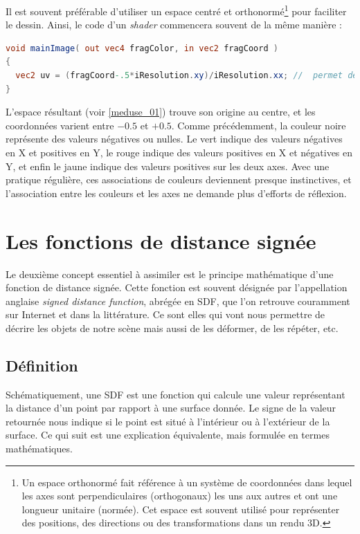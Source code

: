 Il est souvent préférable d'utiliser un espace centré et orthonormé\footnote{Un espace orthonormé fait référence à un système de coordonnées dans lequel les axes sont perpendiculaires (orthogonaux) les uns aux autres et ont une longueur unitaire (normée). Cet espace est souvent utilisé pour représenter des positions, des directions ou des transformations dans un rendu 3D.} pour faciliter le dessin. Ainsi, le code d'un \textit{shader} commencera souvent de la même manière :

\begin{minipage}{\linewidth}
\begin{lstlisting}[language=GLSL, caption=Repère centré et orthonormé,captionpos=b,frame=single]
void mainImage( out vec4 fragColor, in vec2 fragCoord )
{
  vec2 uv = (fragCoord-.5*iResolution.xy)/iResolution.xx; //  permet de centrer nos coordonnees
}
\end{lstlisting}
\end{minipage}

L'espace résultant (voir \ref{meduse_01}) trouve son origine au centre, et les coordonnées varient entre $-0.5$ et $+0.5$. Comme précédemment, la couleur noire représente des valeurs négatives ou nulles. Le vert indique des valeurs négatives en X et positives en Y, le rouge indique des valeurs positives en X et négatives en Y, et enfin le jaune indique des valeurs positives sur les deux axes. Avec une pratique régulière, ces associations de couleurs deviennent presque instinctives, et l'association entre les couleurs et les axes ne demande plus d'efforts de réflexion.

\newpage
\section{Les fonctions de distance signée}

Le deuxième concept essentiel à assimiler est le principe mathématique d'une fonction de distance signée. Cette fonction est souvent désignée par l'appellation anglaise \textit{signed distance function}, abrégée en SDF, que l'on retrouve couramment sur Internet et dans la littérature. Ce sont elles qui vont nous permettre de décrire les objets de notre scène mais aussi de les déformer, de les répéter, etc.

\subsection*{Définition}

Schématiquement, une SDF est une fonction qui calcule une valeur représentant la distance d'un point par rapport à une surface donnée. Le signe de la valeur retournée nous indique si le point est situé à l'intérieur ou à l'extérieur de la surface. Ce qui suit est une explication équivalente, mais formulée en termes mathématiques.

